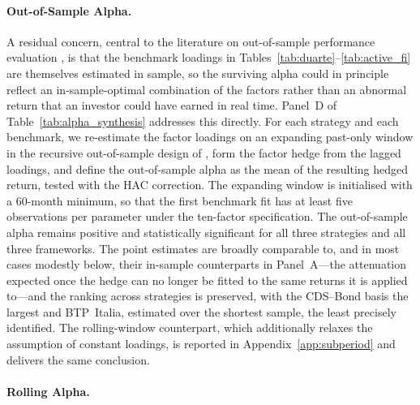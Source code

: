 \paragraph{Out-of-Sample Alpha.}

A residual concern, central to the literature on out-of-sample
performance evaluation \citep{moreira2017volatility, cederburg2020performance},
is that the benchmark loadings in
Tables~\ref{tab:duarte}--\ref{tab:active_fi} are themselves estimated in
sample, so the surviving alpha could in principle reflect an
in-sample-optimal combination of the factors rather than an abnormal
return that an investor could have earned in real time. Panel~D of
Table~\ref{tab:alpha_synthesis} addresses this directly. For each
strategy and each benchmark, we re-estimate the factor loadings on an
expanding past-only window in the recursive out-of-sample design of
\citet{welch2008comprehensive}, form the factor hedge from the lagged
loadings, and define the out-of-sample alpha as the mean of the resulting hedged return,
tested with the \citet{newey1994automatic} HAC correction. The expanding
window is initialised with a 60-month minimum, so that the first
benchmark fit has at least five observations per parameter under the
ten-factor \citet{duarte2007risk} specification. The out-of-sample alpha remains
positive and statistically significant for all three strategies and all
three frameworks. The point estimates are broadly comparable to, and in
most cases modestly below, their in-sample counterparts in
Panel~A---the attenuation expected once the hedge can no longer be
fitted to the same returns it is applied to---and the ranking across
strategies is preserved, with the CDS--Bond basis the largest and
BTP~Italia, estimated over the shortest sample, the least precisely
identified. The rolling-window counterpart, which additionally relaxes
the assumption of constant loadings, is reported in
Appendix~\ref{app:subperiod} and delivers the same conclusion.

\paragraph{Rolling Alpha.}


